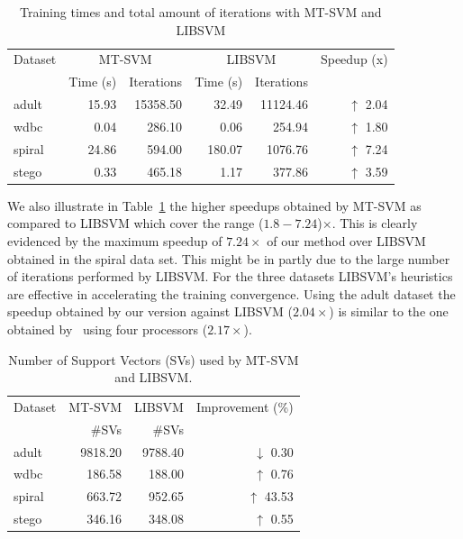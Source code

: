 \documentclass{llncs}
\begin{document}
\begin{table}[!ht]
  \centering
  \caption{Training times and total amount of iterations with MT-SVM and LIBSVM}
    \begin{tabular}{|l|r|r|r|r|r|} \hline
    Dataset & \multicolumn{2}{|c|}{MT-SVM} & \multicolumn{2}{|c|}{LIBSVM} & Speedup (x) \\ 
          & Time (s) & Iterations & Time (s) & Iterations &  \\ \hline\hline
    adult & 15.93 & 15358.50 & 32.49 & 11124.46 & $\uparrow$ 2.04 \\
    wdbc  & 0.04  & 286.10 & 0.06  & 254.94 &  $\uparrow$ 1.80 \\
    spiral & 24.86 & 594.00 & 180.07 & 1076.76 & $\uparrow$ 7.24 \\ \hline
    stego & 0.33 & 465.18 & 1.17 & 377.86 & $\uparrow$ 3.59 \\ \hline
    \end{tabular}
  \label{tab:results_training}
\end{table}

We also illustrate  in Table~\ref{tab:results_training} the higher speedups obtained by MT-SVM as compared to LIBSVM which cover the range ($1.8 - 7.24$)$\times$. This is clearly evidenced by the maximum speedup of $7.24\times$ of  our method over LIBSVM obtained in the spiral data set. This might be in partly due to the large number of iterations  performed by LIBSVM. For the three datasets LIBSVM's heuristics are effective in accelerating the training convergence. Using the adult dataset the speedup obtained by our version against LIBSVM ($2.04\times$) is similar to the one obtained by~\cite{L.J.Cao2006} using four processors ($2.17\times$).

\begin{table}[!ht]
  \centering
  \caption{Number of Support Vectors (SVs) used by MT-SVM and LIBSVM.}
    \begin{tabular}{|l|r|r|r|} \hline
    Dataset & MT-SVM & LIBSVM & Improvement (\%)\\
          & \#SVs & \#SVs &  \\ \hline\hline
    adult & 9818.20 & 9788.40 & $\downarrow$ 0.30 \\
    wdbc  & 186.58 & 188.00 & $\uparrow$ 0.76 \\
    spiral & 663.72 & 952.65 & $\uparrow$ 43.53 \\ \hline
    stego & 346.16 & 348.08 & $\uparrow$ 0.55 \\ \hline
    \end{tabular}
  \label{tab:results_svs}
\end{table}
\end{document}

